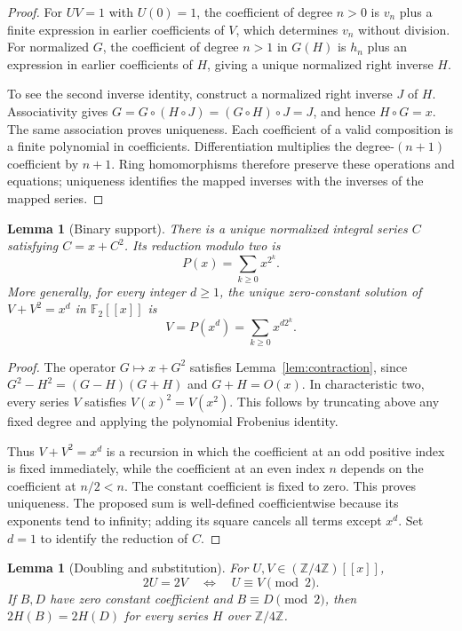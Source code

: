 \documentclass[11pt,a4paper]{article}
\newtheorem{lemma}[theorem]{Lemma}
\theoremstyle{remark}
\newcommand{\Z}{\mathbb Z}
\newcommand{\F}{\mathbb F}
\newcommand{\ps}[1]{#1[[x]]}
\begin{document}
\begin{proof}
For $UV=1$ with $U(0)=1$, the coefficient of degree $n>0$ is $v_n$ plus
a finite expression in earlier coefficients of $V$, which determines
$v_n$ without division. For normalized $G$, the coefficient of degree
$n>1$ in $G(H)$ is $h_n$ plus an expression in earlier coefficients of
$H$, giving a unique normalized right inverse $H$.

To see the second inverse identity, construct a normalized right inverse
$J$ of $H$. Associativity gives
$G=G\circ(H\circ J)=(G\circ H)\circ J=J$, and hence $H\circ G=x$.
The same association proves uniqueness. Each coefficient of a valid
composition is a finite polynomial in coefficients. Differentiation
multiplies the degree-$(n+1)$ coefficient by $n+1$. Ring homomorphisms
therefore preserve these operations and equations; uniqueness identifies
the mapped inverses with the inverses of the mapped series.
\end{proof}

\begin{lemma}[Binary support]\label{lem:binary}
There is a unique normalized integral series $C$ satisfying $C=x+C^2$.
Its reduction modulo two is
\[
 P(x)=\sum_{k\ge0}x^{2^k}.
\]
More generally, for every integer $d\ge1$, the unique zero-constant
solution of $V+V^2=x^d$ in $\ps{\F_2}$ is
\[
 V=P(x^d)=\sum_{k\ge0}x^{d2^k}.
\]
\end{lemma}

\begin{proof}
The operator $G\mapsto x+G^2$ satisfies Lemma~\ref{lem:contraction},
since $G^2-H^2=(G-H)(G+H)$ and $G+H=O(x)$. In characteristic two,
every series $V$ satisfies $V(x)^2=V(x^2)$. This follows by truncating
above any fixed degree and applying the polynomial Frobenius identity.

Thus $V+V^2=x^d$ is a recursion in which the coefficient at an odd positive
index is fixed immediately, while the coefficient at an even index $n$
depends on the coefficient at $n/2<n$. The constant coefficient is fixed
to zero. This proves uniqueness. The proposed sum is well-defined
coefficientwise because its exponents tend to infinity; adding its square
cancels all terms except $x^d$. Set $d=1$ to identify the reduction of $C$.
\end{proof}

\begin{lemma}[Doubling and substitution]\label{lem:double}
For $U,V\in(\Z/4\Z)[[x]]$,
\[
 2U=2V\quad\Longleftrightarrow\quad
 U\equiv V\pmod2.
\]
If $B,D$ have zero constant coefficient and $B\equiv D\pmod2$, then
$2H(B)=2H(D)$ for every series $H$ over $\Z/4\Z$.
\end{lemma}
\end{document}
